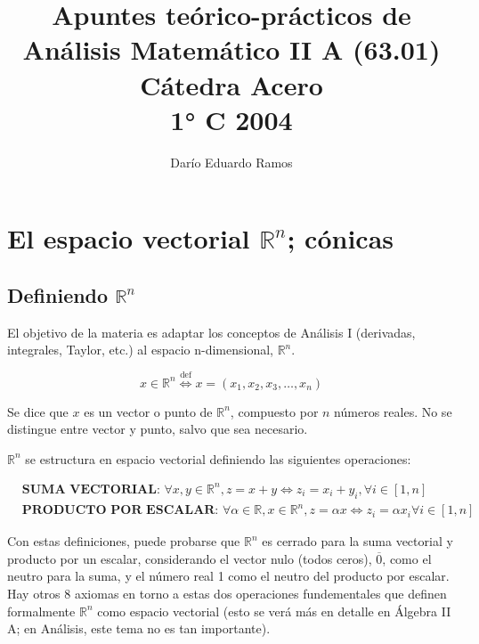 \documentclass{article}
\title{Apuntes teórico-prácticos de Análisis Matemático II A (63.01) \\ Cátedra Acero \\ 1° C 2004}
\author{Darío Eduardo Ramos}
\renewcommand{\Bbb}{\mathbb}
\begin{document}
\maketitle

\tableofcontents{}
\newpage


\section{El espacio vectorial \texorpdfstring{$\Bbb R^n$}{Rn}; cónicas}

\subsection{Definiendo \texorpdfstring{$\Bbb R^n$}{Rn}}

El objetivo de la materia es adaptar los conceptos de Análisis I (derivadas, integrales, Taylor, etc.) al espacio n-dimensional, $\mathbb{R}^n$.

\begin{equation}
x \in \Bbb R^n \overset{\text{def}}{\Longleftrightarrow} x = (x_1, x_2, x_3, \ldots, x_n)
\end{equation}

Se dice que $x$ es un vector o punto de $\Bbb R^n$, compuesto por $n$ números reales. No se distingue entre vector y punto, salvo que sea necesario.

$\Bbb R^n$ se estructura en espacio vectorial definiendo las siguientes operaciones:

\begin{subequations}
\begin{align}
& \textbf{SUMA VECTORIAL: } \forall x, y \in \Bbb R^n, z = x + y \Longleftrightarrow z_i = x_i + y_i, \forall i \in [1, n] \\
& \textbf{PRODUCTO POR ESCALAR: } \forall \alpha \in \Bbb R, x \in \Bbb R^n, z = \alpha x \Longleftrightarrow z_i = \alpha x_i \forall i \in [1, n]
\end{align}
\end{subequations}

Con estas definiciones, puede probarse que $\Bbb R^n$ es cerrado para la suma vectorial y producto por un escalar, considerando el vector nulo (todos ceros), $\overline{0}$, como el neutro para la suma, y el número real 1 como el neutro del producto por escalar. Hay otros 8 axiomas en torno a estas dos operaciones fundementales que definen formalmente $\Bbb R^n$ como espacio vectorial (esto se verá más en detalle en Álgebra II A; en Análisis, este tema no es tan importante).
\end{document}
